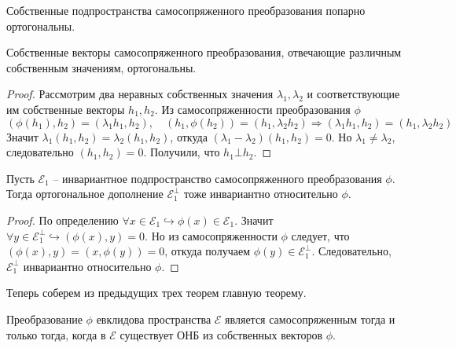 \begin{theorem}
    Собственные подпространства самосопряженного преобразования попарно ортогональны.
\end{theorem}
\begin{theorem}
    Собственные векторы самосопряженного преобразования, отвечающие различным собственным значениям, ортогональны.
\end{theorem}
\begin{proof}
    Рассмотрим два неравных собственных значения $\lambda_1, \lambda_2$ и соответствующие им собственные векторы $h_1, h_2$. Из самосопряженности преобразования $\phi$
    \[
    (\phi(h_1), h_2)=(\lambda_1h_1,h_2), \quad (h_1, \phi(h_2))=(h_1,\lambda_2h_2) \Rightarrow (\lambda_1h_1,h_2)=(h_1,\lambda_2h_2)
    \]
    Значит $\lambda_1(h_1,h_2)=\lambda_2(h_1,h_2)$, откуда $(\lambda_1-\lambda_2)(h_1,h_2)=0$. Но $\lambda_1\neq\lambda_2$, следовательно $(h_1,h_2)=0$. Получили, что $h_1 \bot h_2$.
\end{proof}
\begin{theorem}
    Пусть $\mathcal{E}_1$ -- инвариантное подпространство самосопряженного преобразования $\phi$. Тогда ортогональное дополнение $\mathcal{E}_1^{\bot}$ тоже инвариантно относительно $\phi$.
\end{theorem}
\begin{proof}
    По определению $\forall x\in \mathcal{E}_1\hookrightarrow \phi(x)\in \mathcal{E}_1$. Значит $\forall y\in \mathcal{E}_1^{\bot} \hookrightarrow (\phi(x), y)=0$. Но из самосопряженности $\phi$ следует, что $(\phi(x), y)=(x,\phi(y))=0$, откуда получаем $\phi(y)\in \mathcal{E}_1^{\bot}$. Следовательно, $\mathcal{E}_1^{\bot}$ инвариантно относительно $\phi$.
\end{proof}
Теперь соберем из предыдущих трех теорем главную теорему.
\begin{theorem}
    Преобразование $\phi$ евклидова пространства $\mathcal{E}$ является самосопряженным тогда и только тогда, когда в $\mathcal{E}$ существует ОНБ из собственных векторов $\phi$.
\end{theorem}
